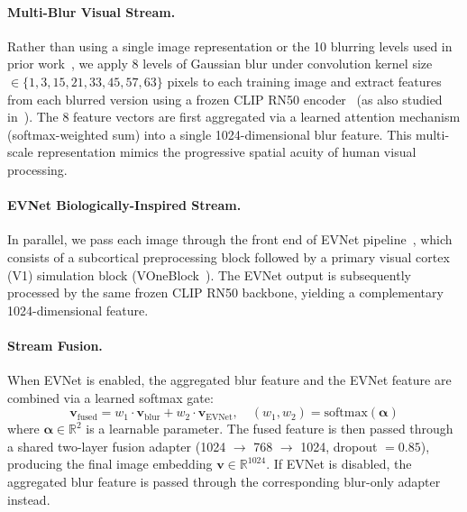 \documentclass[11pt]{article}
\begin{document}
\paragraph{Multi-Blur Visual Stream.}
Rather than using a single image representation or the 10 blurring levels used in prior work~\citep{ved2026}, we apply 8 levels of Gaussian blur under convolution kernel size $\in \{1, 3, 15, 21, 33, 45, 57, 63\}$ pixels to each training image and extract features from each blurred version using a frozen CLIP RN50 encoder~\citep{radford2021clip} (as also studied in~\citep{cherti2023openclip}).
The 8 feature vectors are first aggregated via a learned attention mechanism (softmax-weighted sum) into a single 1024-dimensional blur feature.
This multi-scale representation mimics the progressive spatial acuity of human visual processing.

\paragraph{EVNet Biologically-Inspired Stream.}
In parallel, we pass each image through the front end of EVNet pipeline~\citep{evnet2025}, which consists of a subcortical preprocessing block followed by a primary visual cortex (V1) simulation block (VOneBlock~\citep{vone2020}).
The EVNet output is subsequently processed by the same frozen CLIP RN50 backbone, yielding a complementary 1024-dimensional feature.

\paragraph{Stream Fusion.}
When EVNet is enabled, the aggregated blur feature and the EVNet feature are combined via a learned softmax gate:
\begin{equation}
  \mathbf{v}_\text{fused} = w_1 \cdot \mathbf{v}_\text{blur} + w_2 \cdot \mathbf{v}_\text{EVNet}, \quad (w_1, w_2) = \text{softmax}(\boldsymbol{\alpha})
\end{equation}
where $\boldsymbol{\alpha} \in \mathbb{R}^2$ is a learnable parameter.
The fused feature is then passed through a shared two-layer fusion adapter (1024 $\to$ 768 $\to$ 1024, dropout $=0.85$), producing the final image embedding $\mathbf{v} \in \mathbb{R}^{1024}$.
If EVNet is disabled, the aggregated blur feature is passed through the corresponding blur-only adapter instead.
\end{document}
